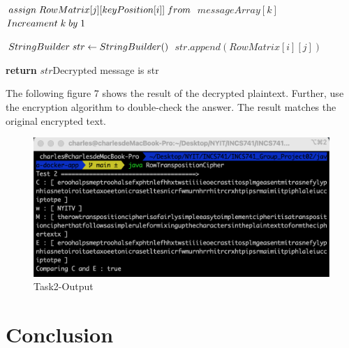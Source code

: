 \documentclass[twoside,twocolumn]{article}
\begin{document}
\begin{algorithm}
\begin{algorithmic}[1]
        	   \State $assign \hspace{0.1cm}  RowMatrix[j][keyPosition[i]] \hspace{0.1cm}  from$
        	   \State $messageArray[k]$
        	   \State \footnotesize $Increament\hspace{0.1cm} k\hspace{0.1cm} by \hspace{0.1cm}1$	
        	   \State \footnotesize$ $
		    \EndIf
        \EndFor  
      \EndFor  
               
      \State \footnotesize $ StringBuilder\hspace{0.1cm} str \gets StringBuilder()$
	  		\State $ str.append(RowMatrix[i][j]) $
		    \EndIf
        \EndFor  
      \EndFor  
      
      \State \textbf{return} $str$\Comment \tiny{Decrypted message is str}
    \EndFunction
  \end{algorithmic}
\end{algorithm}


The following figure 7 shows the result of the decrypted plaintext. Further, use the encryption algorithm to double-check the answer. The result matches the original encrypted text.

\begin{figure}[H]
  \centering
  \includegraphics[scale=0.35]{./Graphs/Figure2.0.png}
  \caption{Task2-Output}
  \label{fig:testfig1}
\end{figure}




\section{Conclusion}
\end{document}
